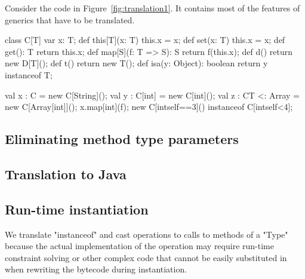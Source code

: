 Consider the code in Figure~\ref{fig:translation1}.  It contains most of the
features of generics that have to be translated.
\begin{figure*}[tp]
{\footnotesize
\begin{xten}
class C[T] {
    var x: T;
    def this[T](x: T) { this.x = x; }
    def set(x: T) { this.x = x; }
    def get(): T { return this.x; }
    def map[S](f: T => S): S { return f(this.x); }
    def d() { return new D[T](); }
    def t() { return new T(); }
    def isa(y: Object): boolean { return y instanceof T; }
}

val x : C = new C[String]();
val y : C[int] = new C[int]();
val z : C{T <: Array} = new C[Array[int]]();
x.map[int](f);
new C[int{self==3}]() instanceof C[int{self<4}];
\end{xten}}
\caption{Code to translate}
\label{fig:translation1}
\end{figure*}

\subsection{Eliminating method type parameters}

\subsection{Translation to Java}

\subsection{Run-time instantiation}

We translate \xcd"instanceof" and cast operations to calls to
methods of a \xcd"Type" because the actual implementation of
the operation may require run-time constraint solving or other
complex code that cannot be easily substituted in when rewriting
the bytecode during instantiation.
